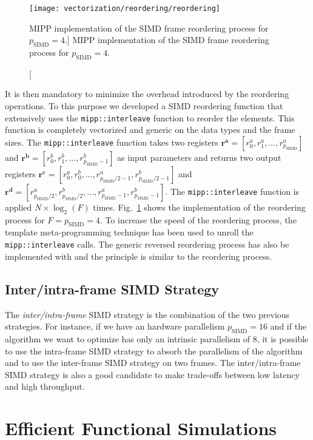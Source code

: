 \begin{figure}[htp]
  \centering
  \texttt{[image: vectorization/reordering/reordering]}
  \caption
    [MIPP implementation of the SIMD frame reordering process for
     $p_\text{SIMD} = 4$.]
    {MIPP implementation of the SIMD frame reordering process for
     $p_\text{SIMD} = 4$.}
  \label{fig:opt_vec_reordering}
\end{figure}

It is then mandatory to minimize the overhead introduced by the reordering
operations. To this purpose we developed a SIMD reordering function that
extensively uses the \verb|mipp::interleave| function to reorder the elements.
This function is completely vectorized and generic on the data types and the
frame sizes. The \verb|mipp::interleave| function takes two registers $\bm{r^a}
= [r^a_0, r^a_1, ..., r^a_{p_\text{SIMD}}]$ and $\bm{r^b} = [r^b_0, r^b_1,
..., r^b_{p_\text{SIMD}-1}]$ as input parameters and returns two output
registers $\bm{r^c} = [r^a_0, r^b_0, ..., r^a_{p_\text{SIMD}/2-1},
r^b_{p_\text{SIMD}/2-1}]$ and $\bm{r^d} = [r^a_{p_\text{SIMD}/2},
r^b_{p_\text{SIMD}/2}, ..., r^a_{p_\text{SIMD}-1}, r^b_{p_\text{SIMD}-1}]$.
The \verb|mipp::interleave| function is applied $N \times \log_2(F)$ times.
Fig.~\ref{fig:opt_vec_reordering} shows the \MIPP implementation of the
reordering process for $F = p_\text{SIMD} = 4$. To increase the speed of the
reordering process, the template meta-programming technique has been used to
unroll the \verb|mipp::interleave| calls. The generic reversed reordering
process has also be implemented with \MIPP and the principle is similar to the
reordering process.

\subsection{Inter/intra-frame SIMD Strategy}

The \emph{inter/intra-frame} SIMD strategy is the combination of the two
previous strategies. For instance, if we have an hardware parallelism
$p_\text{SIMD} = 16$ and if the algorithm we want to optimize has only an
intrinsic parallelism of 8, it is possible to use the intra-frame SIMD strategy
to absorb the parallelism of the algorithm and to use the inter-frame SIMD
strategy on two frames. The inter/intra-frame SIMD strategy is also a good
candidate to make trade-offs between low latency and high throughput.

\section{Efficient Functional Simulations}
\label{sec:opt_simu}


